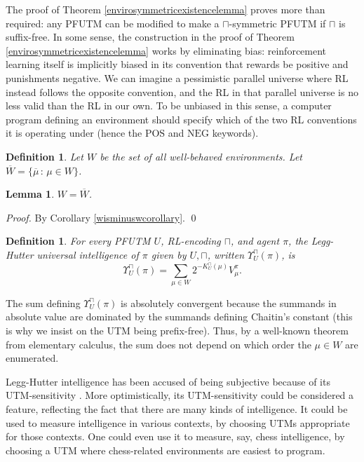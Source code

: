 \documentclass[runningheads]{llncs}
\newtheorem{mydefinition}[mytheorem]{Definition}
\newtheorem{mylemma}[mytheorem]{Lemma}
\def\LH{\Upsilon}
\begin{document}
The proof of Theorem \ref{envirosymmetricexistencelemma} proves more than required:
any PFUTM can be modified to make a $\sqcap$-symmetric PFUTM
if $\sqcap$ is suffix-free. In some sense,
the construction in the proof of Theorem \ref{envirosymmetricexistencelemma} works
by eliminating bias: reinforcement learning itself is implicitly biased in its
convention that rewards be positive and punishments negative. We can imagine
a pessimistic parallel universe
where RL instead follows the opposite convention, and the
RL in that parallel universe is no less valid than the RL in our own. To be
unbiased in this sense, a computer program defining an environment
should specify which of the two RL conventions it is operating under (hence the
$\mathrm{POS}$ and $\mathrm{NEG}$ keywords).

\begin{mydefinition}
    Let $W$ be the set of all well-behaved environments.
    Let $\overline W=\{\overline\mu\,:\,\mu\in W\}$.
\end{mydefinition}

\begin{mylemma}
\label{WequalsminusWlemma}
$W=\overline W$.
\end{mylemma}

\begin{proof}
    By Corollary \ref{wisminuswcorollary}.
    \qed
\end{proof}

\begin{mydefinition}
\label{universalintelligencedefn}
For every PFUTM $U$, RL-encoding $\sqcap$, and agent $\pi$,
the \emph{Legg-Hutter universal intelligence of $\pi$ given
by $U,\sqcap$}, written $\LH^\sqcap_U(\pi)$, is
\[
    \LH^\sqcap_U(\pi) = \sum_{\mu \in W} 2^{-K^\sqcap_U(\mu)}V^\pi_\mu.
\]
\end{mydefinition}

The sum defining $\LH^\sqcap_U(\pi)$ is absolutely convergent because the summands
in absolute value are dominated by the summands defining Chaitin's constant
(this is why we insist on the UTM being prefix-free).
Thus, by a well-known
theorem from elementary calculus, the sum does not depend on which order the $\mu\in W$
are enumerated.

Legg-Hutter intelligence has been accused of being subjective
because of its UTM-sensitivity \cite{leike2015bad}. More optimistically,
its UTM-sensitivity could be considered a feature, reflecting the fact
that there are many kinds of intelligence. It could be used to measure
intelligence in various contexts, by choosing UTMs appropriate for those
contexts. One could even use it to measure, say, chess intelligence,
by choosing a UTM where chess-related environments are easiest to program.
\end{document}

